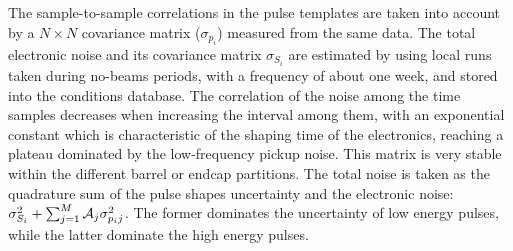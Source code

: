\documentclass[journal]{IEEEtran}
\begin{document}
The sample-to-sample correlations in the pulse templates are taken into account by a $N \times N$ covariance matrix ($\sigma_{p_i}$) measured from the same data. The total electronic noise and its covariance matrix $\sigma_{S_i}$ are estimated by using local runs taken during no-beams periods, with a frequency of about one week, and stored into the conditions database. The correlation of the noise among the time samples decreases when increasing the interval among them, with an exponential constant which is characteristic of the shaping time of the electronics, reaching a plateau dominated by the low-frequency pickup noise. This matrix is very stable within the different barrel or endcap partitions. 
The total noise is taken as the quadrature sum of the pulse shapes uncertainty and the electronic noise: $\sigma_{S_i}^2+\sum_{j=1}^M {\cal A}_{j}\sigma_{p_ij}^2$. The former dominates the uncertainty of low energy pulses, while the latter dominate the high energy pulses.
%
\end{document}
